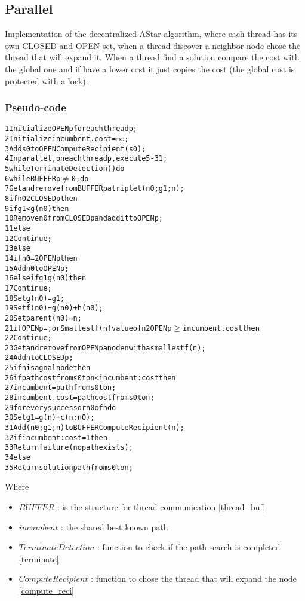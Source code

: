 \subsection{Parallel}

Implementation of the decentralized AStar algorithm, where each thread has its own CLOSED and OPEN set, when a thread discover a neighbor node chose the thread that will expand it.
When a thread find a solution compare the cost with the global one and if have a lower cost it just copies the cost (the global cost is protected with a lock).

\subsubsection{Pseudo-code}

\begin{alltt}
    1 Initialize OPENp for each thread p;
    2 Initialize incumbent.cost = \(\infty\);
    3 Add s0 to OPENComputeRecipient(s0);
    4 In parallel, on each thread p, execute 5-31;
    5 while TerminateDetection() do
    6   while BUFFERp \(\neq\) 0 ; do
    7       Get and remove from BUFFERp a triplet (n0; g1; n);
    8       if n0 2 CLOSEDp then
    9           if g1 < g(n0) then
    10              Remove n0 from CLOSEDp and add it to OPENp;
    11             else
    12                  Continue;
    13      else
    14          if n0 =2 OPENp then
    15              Add n0 to OPENp;
    16          else if g1  g(n0) then
    17              Continue;
    18      Set g(n0) = g1;
    19      Set f(n0) = g(n0) + h(n0);
    20      Set parent(n0) = n;
    21  if OPENp = ; or Smallest f(n) value of n 2 OPENp \(\geq\) incumbent.cost then
    22      Continue;
    23  Get and remove from OPENp a node n with a smallest f(n);
    24  Add n to CLOSEDp;
    25  if n is a goal node then
    26      if path cost from s0 to n < incumbent:cost then
    27          incumbent = path from s0 to n;
    28          incumbent.cost = path cost from s0 to n;
    29  for every successor n0 of n do
    30      Set g1 = g(n) + c(n; n0);
    31      Add (n0; g1; n) to BUFFER ComputeRecipient(n);
    32 if incumbent:cost = 1 then
    33  Return failure (no path exists);
    34 else
    35  Return solution path from s0 to n;
\end{alltt}

Where
\begin{itemize}
    \item $BUFFER$ : is the structure for thread communication \ref{thread_buf}
    \item $incumbent$ :  the shared best known path
    \item $TerminateDetection$ : function to check if the path search is completed \ref{terminate}
    \item $ComputeRecipient$ : function to chose the thread that will expand the node \ref{compute_reci}
\end{itemize}

